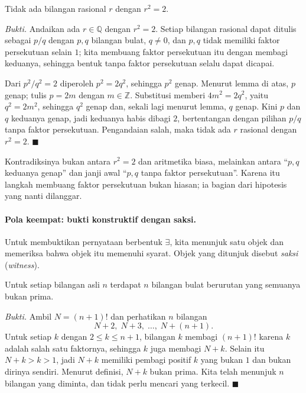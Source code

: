 \begin{teorema}
Tidak ada bilangan rasional $r$ dengan $r^{2} = 2$.
\end{teorema}
\par\smallskip\noindent\textit{Bukti.} Andaikan ada $r \in \mathbb{Q}$ dengan
$r^{2} = 2$. Setiap bilangan rasional dapat ditulis sebagai $p/q$ dengan $p,q$ bilangan
bulat, $q \neq 0$, dan $p,q$ tidak memiliki faktor persekutuan selain $1$; kita
membuang faktor persekutuan itu dengan membagi keduanya, sehingga bentuk tanpa faktor
persekutuan selalu dapat dicapai.

Dari $p^{2}/q^{2} = 2$ diperoleh $p^{2} = 2q^{2}$, sehingga $p^{2}$ genap. Menurut
lemma di atas, $p$ genap; tulis $p = 2m$ dengan $m \in \mathbb{Z}$. Substitusi memberi
$4m^{2} = 2q^{2}$, yaitu $q^{2} = 2m^{2}$, sehingga $q^{2}$ genap dan, sekali lagi
menurut lemma, $q$ genap. Kini $p$ dan $q$ keduanya genap, jadi keduanya habis dibagi
$2$, bertentangan dengan pilihan $p/q$ tanpa faktor persekutuan. Pengandaian salah,
maka tidak ada $r$ rasional dengan $r^{2} = 2$.
\hfill$\blacksquare${\parfillskip=0pt\par}

Kontradiksinya bukan antara $r^{2}=2$ dan aritmetika biasa, melainkan antara ``$p,q$
keduanya genap'' dan janji awal ``$p,q$ tanpa faktor persekutuan''. Karena itu langkah
membuang faktor persekutuan bukan hiasan; ia bagian dari hipotesis yang nanti dilanggar.

\paragraph{Pola keempat: bukti konstruktif dengan saksi.} Untuk membuktikan pernyataan
berbentuk $\exists$, kita menunjuk satu objek dan memeriksa bahwa objek itu memenuhi
syarat. Objek yang ditunjuk disebut \emph{saksi} (\emph{witness}).

\begin{teorema}
Untuk setiap bilangan asli $n$ terdapat $n$ bilangan bulat berurutan yang semuanya
bukan prima.
\end{teorema}
\par\smallskip\noindent\textit{Bukti.} Ambil $N = (n+1)!$ dan perhatikan $n$ bilangan
\[
  N+2,\; N+3,\; \dots,\; N+(n+1).
\]
Untuk setiap $k$ dengan $2 \leq k \leq n+1$, bilangan $k$ membagi $(n+1)!$ karena $k$
adalah salah satu faktornya, sehingga $k$ juga membagi $N+k$. Selain itu
$N+k > k > 1$, jadi $N+k$ memiliki pembagi positif $k$ yang bukan $1$ dan bukan
dirinya sendiri. Menurut definisi, $N+k$ bukan prima. Kita telah menunjuk $n$ bilangan
yang diminta, dan tidak perlu mencari yang terkecil.
\hfill$\blacksquare${\parfillskip=0pt\par}

